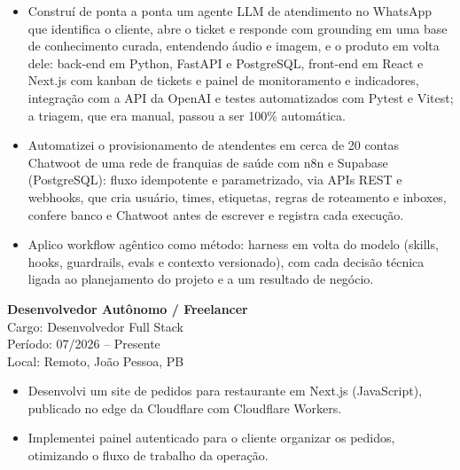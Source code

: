 \documentclass[10pt,a4paper]{article}
\begin{document}
\begin{itemize}
\item Construí de ponta a ponta um agente LLM de atendimento no WhatsApp que
identifica o cliente, abre o ticket e responde com grounding em uma base de
conhecimento curada, entendendo áudio e imagem, e o produto em volta dele:
back-end em Python, FastAPI e PostgreSQL, front-end em React e Next.js com
kanban de tickets e painel de monitoramento e indicadores, integração com a
API da OpenAI e testes automatizados com Pytest e Vitest; a triagem, que era
manual, passou a ser 100\% automática.
\item Automatizei o provisionamento de atendentes em cerca de 20 contas
Chatwoot de uma rede de franquias de saúde com n8n e Supabase (PostgreSQL):
fluxo idempotente e parametrizado, via APIs REST e webhooks, que cria usuário,
times, etiquetas, regras de roteamento e inboxes, confere banco e Chatwoot
antes de escrever e registra cada execução.
\item Aplico workflow agêntico como método: harness em volta do modelo
(skills, hooks, guardrails, evals e contexto versionado), com cada decisão
técnica ligada ao planejamento do projeto e a um resultado de negócio.
\end{itemize}


\textbf{Desenvolvedor Autônomo / Freelancer} \\
Cargo: Desenvolvedor Full Stack \\
Período: 07/2026 -- Presente \\
Local: Remoto, João Pessoa, PB

\begin{itemize}
\item Desenvolvi um site de pedidos para restaurante em Next.js (JavaScript),
publicado no edge da Cloudflare com Cloudflare Workers.
\item Implementei painel autenticado para o cliente organizar os pedidos,
otimizando o fluxo de trabalho da operação.
\end{itemize}
\end{document}
